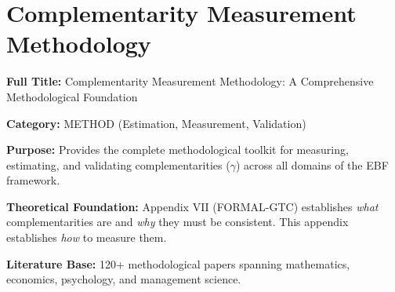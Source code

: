 
\chapter{Complementarity Measurement Methodology}
\label{app:method-comp}

\begin{tcolorbox}[colback=orange!5!white,colframe=orange!75!black,title=\textbf{Appendix VIII: METHOD-COMP}]
\textbf{Full Title:} Complementarity Measurement Methodology: A Comprehensive Methodological Foundation

\textbf{Category:} METHOD (Estimation, Measurement, Validation)

\textbf{Purpose:} Provides the complete methodological toolkit for measuring, estimating, and validating complementarities ($\gamma$) across all domains of the EBF framework.

\textbf{Theoretical Foundation:} Appendix VII (FORMAL-GTC) establishes \textit{what} complementarities are and \textit{why} they must be consistent. This appendix establishes \textit{how} to measure them.

\textbf{Literature Base:} 120+ methodological papers spanning mathematics, economics, psychology, and management science.
\end{tcolorbox}

